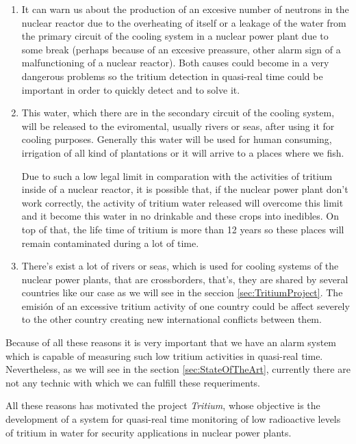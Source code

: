 \begin{enumerate}

\item{} It can warn us about the production of an excesive number of neutrons in the nuclear reactor due to the overheating of itself or a leakage of the water from the primary circuit of the cooling system in a nuclear power plant due to some break (perhaps because of an excesive preassure, other alarm sign of a malfunctioning of a nuclear reactor). Both causes could become in a very dangerous problems so the tritium detection in quasi-real time could be important in order to quickly detect and to solve it.

\item{} This water, which there are in the secondary circuit of the cooling system, will be released to the eviromental, usually rivers or seas, after using it for cooling purposes. Generally this water will be used for human consuming, irrigation of all kind of plantations or it will arrive to a places where we fish. 

Due to such a low legal limit in comparation with the activities of tritium inside of a nuclear reactor, it is possible that, if the nuclear power plant don't work correctly, the activity of tritium water released will overcome this limit and it become this water in no drinkable and these crops into inedibles. On top of that, the life time of tritium is more than 12 years so these places will remain contaminated during a lot of time. 

\item{} There's exist a lot of rivers or seas, which is used for cooling systems of the nuclear power plants, that are crossborders, that's, they are shared by several countries like our case as we will see in the seccion \ref{sec:TritiumProject}. The emisión of an excessive tritium activity of one country could be affect severely to the other country creating new international conflicts between them.

\end{enumerate}

Because of all these reasons it is very important that we have an alarm system which is capable of measuring such low tritium activities in quasi-real time. Nevertheless, as we will see in the section \ref{sec:StateOfTheArt}, currently there are not any technic with which we can fulfill these requeriments.

All these reasons has motivated the project \textit{Tritium}, whose objective is the development of a system for quasi-real time monitoring of low radioactive levels of tritium in water for security applications in nuclear power plants.